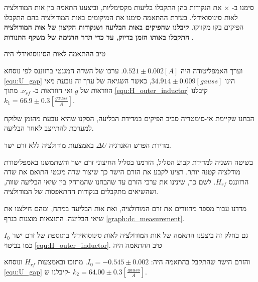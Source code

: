 \documentclass{article}
\begin{document}
סימנו ב-
$\times$
את הנקודות בהן התקבלו בליעות מקסימליות, וביצענו התאמה בין אות המודולציה לאות סינוסואידלי. בעזרת ההתאמה סימנו את המיקומים באות המודולציה בהם התקבלו הפיקים בקו מקווקו.
\textbf{
קיבלנו שהפיקים באות הבליעה ושנקודות הקיצון של אות המודולציה התקבלו באותו הזמן בדיוק, עד כדי תדר הדגימה של משקף התנודות
}.


טיב ההתאמה לאות הסינוסואידלי היה

וערך האמפליטודה היה
$0.521\pm0.002 [A]$.
ערכו של השדה המגנטי ברזוננס לפי נוסחא
\ref{equ:U_gap}
הינו
$34.914\pm0.009 [gauss]$,
כאשר השגיאה של ערך זה נובעת מאי הוודאות של
$g$
ואי הוודאות ב-
$\nu_{rf}$.
מתוך
\ref{equ:H_outer_inductor}
קיבלנו
$k_1 = 66.9\pm 0.3 [\frac{gauss}{A}]$.

הבחנו שקיימת אי-סימטריה סביב הפיקים במדידת הבליעה, הסקנו שהיא נובעת מהזמן שלוקח למערכת להתייצב לאחר הבליעה.
\begin{graph}[H]
	\begin{center}
	\resizebox{\textwidth}{!}{}
	\end{center}
	\caption{
	מדידת הפרש האנרגיה
	$\Delta U$
	באמצעות מודולציה ללא זרם ישר.
	}
\label{graph:p2p_measurement}
\end{graph}
\clearpage


בשיטה השניה למדידת קבוע הסליל,  הזרמנו בסליל החיצוני זרם ישר והשתמשנו באמפליטודת מודלציה קטנה יותר.
רצינו לקבע את הזרם הישר כך שיצור שדה מגנטי התואם את שדה הרזוננס
$H_{rf}$.
לשם כך, שינינו את ערכי הזרם עד שהבחנו שהמרחק בין שיאי הבליעה שווה, ושהשיאים מתקבלים בנקודות ההתאפסות של המודולציה.

מדדנו עבור מספר מחזורים את זרם המודולציה,
ואת אות הבליעה במתח, ומהם חילצנו את שיאי הבליעה. התוצאות מוצגות בגרף
\ref{graph:dc_measurement}.

\begin{graph}[H]
	\begin{center}
	\resizebox{\textwidth}{!}{}
	\end{center}
	\caption{
	המתח על הסליל החיצוני כתלות בזמן, בזמן בליעה, עבור זרם ישר המוזרם בסליל החיצוני
	}
\label{graph:dc_measurement}
\end{graph}

גם בחלק זה ביצענו התאמה של אות המודולציה לאות סינוסואידלי בתוספת של זרם ישר
$I_0$
כמו בביטוי
\ref{equ:H_outer_inductor}.
טיב ההתאמה היה 

והזרם הישר שהתקבל בהתאמה היה:
$I_0 = -0.545 \pm 0.002$.
מתוכו ובאמצעות
$H_{rf}$
ונוסחא
\ref{equ:U_gap}
קיבלנו ש-
$k_2 = 64.00 \pm 0.3 [\frac{gauss}{A}]$.
\end{document}
